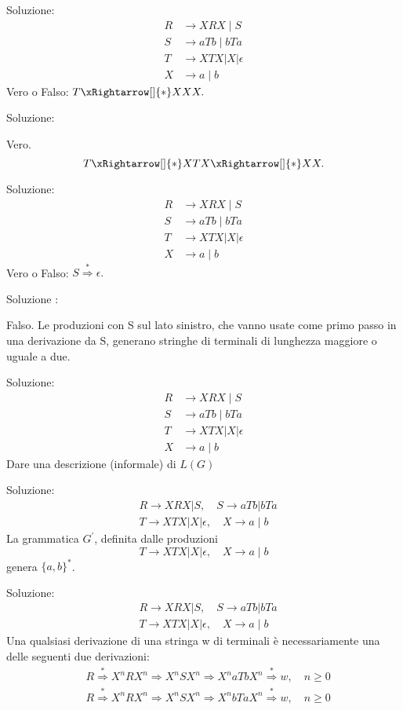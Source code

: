 Soluzione:
$$
\begin{aligned}
R & \rightarrow X R X \mid S \\
S & \rightarrow a T b \mid b T a \\
T & \rightarrow X T X|X| \epsilon \\
X & \rightarrow a \mid b
\end{aligned}
$$
Vero o Falso: $T \xRightarrow[]{*} X X X .$

Soluzione:

Vero.
$$
T \xRightarrow[]{*} X T X \xRightarrow[]{*} X X .
$$

Soluzione:
$$
\begin{aligned}
R & \rightarrow X R X \mid S \\
S & \rightarrow a T b \mid b T a \\
T & \rightarrow X T X|X| \epsilon \\
X & \rightarrow a \mid b
\end{aligned}
$$
Vero o Falso: $S \stackrel{*}{\Rightarrow} \epsilon .$

Soluzione :

Falso. Le produzioni con S sul lato sinistro, che vanno usate come primo passo in una derivazione da S, generano stringhe di terminali di lunghezza maggiore o uguale a due.

Soluzione:
$$
\begin{aligned}
R & \rightarrow X R X \mid S \\
S & \rightarrow a T b \mid b T a \\
T & \rightarrow X T X|X| \epsilon \\
X & \rightarrow a \mid b
\end{aligned}
$$
Dare una descrizione (informale) di $L(G)$

Soluzione:
$$
\begin{aligned}
&R \rightarrow X R X|S, \quad S \rightarrow a T b| b T a \\
&T \rightarrow X T X|X| \epsilon, \quad X \rightarrow a \mid b
\end{aligned}
$$
La grammatica $G^{\prime}$, definita dalle produzioni
$$
T \rightarrow X T X|X| \epsilon, \quad X \rightarrow a \mid b
$$
genera $\{a, b\}^{*}$.

Soluzione:
$$
\begin{aligned}
&R \rightarrow X R X|S, \quad S \rightarrow a T b| b T a \\
&T \rightarrow X T X|X| \epsilon, \quad X \rightarrow a \mid b
\end{aligned}
$$
Una qualsiasi derivazione di una stringa w di terminali è necessariamente una delle seguenti due derivazioni:
$$
\begin{aligned}
&R \stackrel{*}{\Rightarrow} X^{n} R X^{n} \Rightarrow X^{n} S X^{n} \Rightarrow X^{n} a T b X^{n} \stackrel{*}{\Rightarrow} w, \quad n \geq 0 \\
&R \stackrel{*}{\Rightarrow} X^{n} R X^{n} \Rightarrow X^{n} S X^{n} \Rightarrow X^{n} b T a X^{n} \stackrel{*}{\Rightarrow} w, \quad n \geq 0
\end{aligned}
$$

